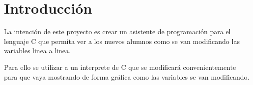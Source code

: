 \chapter{Introducción}

La  intención  de  este  proyecto  es  crear  un  asistente  de  programación para  el lenguaje C que permita ver a los nuevos alumnos como se van modificando las variables linea a linea.

Para ello se utilizar a un interprete de C que se modificará convenientemente para que vaya mostrando de forma gráfica como las variables se van modificando.